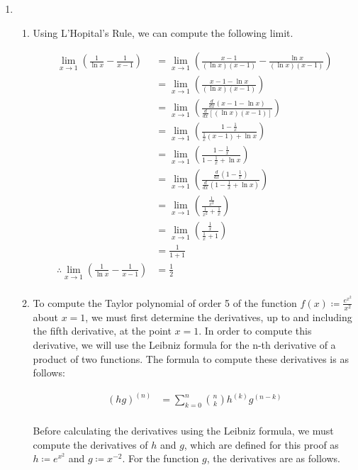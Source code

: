 \documentclass[a4paper]{article}
\begin{document}
\begin{enumerate}[label=\textbf{\arabic*.}]
	\item 

	\begin{enumerate}
		\item Using L'Hopital's Rule, we can compute the following limit.

		\begin{align*}
		\lim_{x\to1}\left(\frac{1}{\ln{x}}-\frac{1}{x-1}\right) & = \lim_{x\to1}\left(\frac{x-1}{(\ln{x})(x-1)}-\frac{\ln{x}}{(\ln{x})(x-1)}\right)\\
		& = \lim_{x\to1}\left(\frac{x-1-\ln{x}}{(\ln{x})(x-1)}\right)\\
		& = \lim_{x\to1}\left(\frac{\frac{d}{dx}(x-1-\ln{x})}{\frac{d}{dx}\left[(\ln{x})(x-1)\right]}\right)\\
		& = \lim_{x\to1}\left(\frac{1-\frac{1}{x}}{\frac{1}{x}(x-1)+\ln{x}}\right)\\
		& = \lim_{x\to1}\left(\frac{1-\frac{1}{x}}{1-\frac{1}{x}+\ln{x}}\right)\\
		& = \lim_{x\to1}\left(\frac{\frac{d}{dx}(1-\frac{1}{x})}{\frac{d}{dx}(1-\frac{1}{x}+\ln{x})}\right)\\
		& = \lim_{x\to1}\left(\frac{\frac{1}{x^2}}{\frac{1}{x^2}+\frac{1}{x}}\right)\\
		& = \lim_{x\to1}\left(\frac{\frac{1}{x}}{\frac{1}{x}+1}\right)\\
		& = \frac{1}{1+1}\\
		\therefore \lim_{x\to1}\left(\frac{1}{\ln{x}}-\frac{1}{x-1}\right) & = \frac{1}{2}\\
		\end{align*}

		\item To compute the Taylor polynomial of order 5 of the function $\displaystyle{f(x) \coloneqq \frac{e^{x^2}}{x^2}}$ about $x = 1$, we must first determine the derivatives, up to and including the fifth derivative, at the point $x = 1$. In order to compute this derivative, we will use the Leibniz formula for the n-th derivative of a product of two functions. The formula to compute these derivatives is as follows:

		\begin{align*}
		(hg)^{(n)} & = \sum_{k = 0}^{n}
		\binom{n}{k} h^{(k)}g^{(n-k)}\\
		\end{align*}

		Before calculating the derivatives using the Leibniz formula, we must compute the derivatives of $h$ and $g$, which are defined for this proof as $h \coloneqq e^{x^2}$ and $g \coloneqq x^{-2}$. For the function $g$, the derivatives are as follows.


\end{enumerate}
\end{enumerate}
\end{document}
